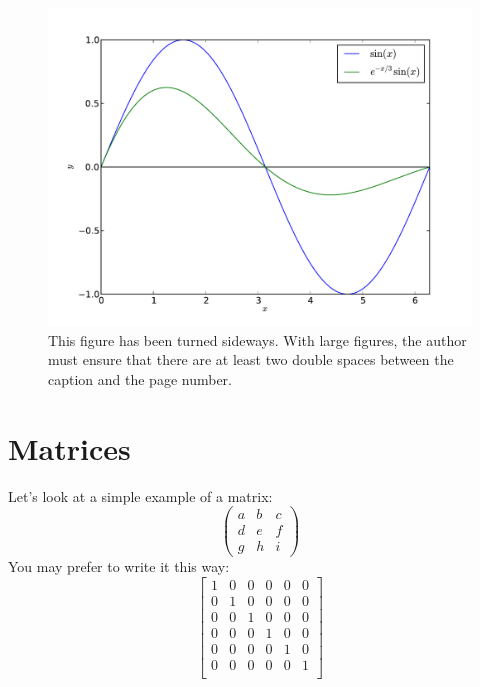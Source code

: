 \thispagestyle{lscapedplain}
\begin{landscape}
\begin{figure}
\centering
\includegraphics[width=\textwidth]{Chapter-2/figs/sine}
\caption{This figure has been turned sideways.  With large figures, 
         the author must ensure that there are at least two double spaces
         between the caption and the page number.}
\label{fig:hist}
\end{figure}
\end{landscape}
\restoregeometry
\pagestyle{fancy}
\thispagestyle{fancy}


\section{Matrices}
Let's look at a simple example of a matrix:
\[ \left( \begin{array}{ccc}
a & b & c \\
d & e & f \\
g & h & i \end{array} \right)\] 
%
You may prefer to write it this way:
\[ \left[\begin{array} {cccccc}
1 & 0 & 0 & 0 & 0 & 0 \\
0 & 1 & 0 & 0 & 0 & 0 \\
0 & 0 & 1 & 0 & 0 & 0 \\
0 & 0 & 0 & 1 & 0 & 0 \\
0 & 0 & 0 & 0 & 1 & 0 \\
0 & 0 & 0 & 0 & 0 & 1 \\
\end{array} \right] \]
